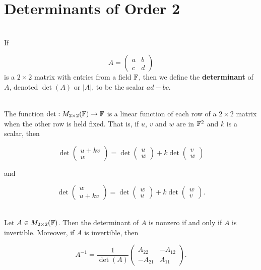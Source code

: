 \section{Determinants of Order 2}

\begin{definition}
	\hfill\\
	If
	
	\[A = \begin{pmatrix}
		a & b \\
		c & d
	\end{pmatrix}\]
	 is a $2 \times 2$ matrix with entries from a field $\mathbb{F}$, then we define the \textbf{determinant} of $A$, denoted $\det(A)$ or $|A|$, to be the scalar $ad-bc$.
\end{definition}

\begin{theorem}
	\hfill\\
	The function $\det: M_{2 \times 2}(\mathbb{F}) \to \mathbb{F}$ is a linear function of each row of a $2 \times 2$ matrix when the other row is held fixed. That is, if $u$, $v$ and $w$ are in $\mathbb{F}^2$ and $k$ is a scalar, then
	
	\[\det \begin{pmatrix}
		u + kv \\
		w
	\end{pmatrix} = \det\begin{pmatrix}
	u \\ w
	\end{pmatrix} + k\det\begin{pmatrix}
	v \\ w
	\end{pmatrix}\]
	
	and
	
	\[\det\begin{pmatrix}
		w \\ u + kv
	\end{pmatrix} = \det\begin{pmatrix}
	w \\ u
	\end{pmatrix} + k \det \begin{pmatrix}
	w \\ v
	\end{pmatrix}.\]
\end{theorem}

\begin{theorem}\label{Theorem 4.2}
	\hfill\\
	Let $A \in M_{2 \times 2}(\mathbb{F})$. Then the determinant of $A$ is nonzero if and only if $A$ is invertible. Moreover, if $A$ is invertible, then
	
	\[A^{-1} = \frac{1}{\det(A)}\begin{pmatrix}
		A_{22} & -A_{12} \\
		-A_{21} & A_{11}
	\end{pmatrix}.\]
\end{theorem}

